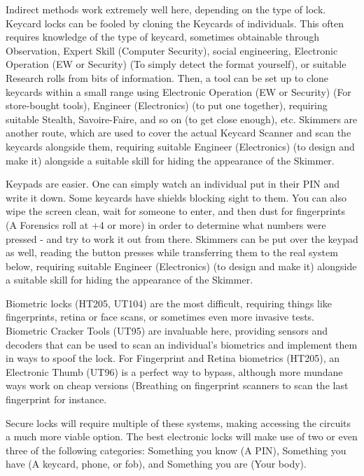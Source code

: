 \begin{multicols*}{2}
	Indirect methods work extremely well here, depending on the type of lock. Keycard locks can be fooled by cloning the Keycards of individuals. This often requires knowledge of the type of keycard, sometimes obtainable through Observation, Expert Skill (Computer Security), social engineering, Electronic Operation (EW or Security) (To simply detect the format yourself), or suitable Research rolls from bits of information. Then, a tool can be set up to clone keycards within a small range using Electronic Operation (EW or Security) (For store-bought tools), Engineer (Electronics) (to put one together), requiring suitable Stealth, Savoire-Faire, and so on (to get close enough), etc. Skimmers are another route, which are used to cover the actual Keycard Scanner and scan the keycards alongside them, requiring suitable Engineer (Electronics) (to design and make it) alongside a suitable skill for hiding the appearance of the Skimmer.
	
	Keypads are easier. One can simply watch an individual put in their PIN and write it down. Some keycards have shields blocking sight to them. You can also wipe the screen clean, wait for someone to enter, and then dust for fingerprints (A Forensics roll at +4 or more) in order to determine what numbers were pressed - and try to work it out from there. Skimmers can be put over the keypad as well, reading the button presses while transferring them to the real system below, requiring suitable Engineer (Electronics) (to design and make it) alongside a suitable skill for hiding the appearance of the Skimmer.
	
	Biometric locks (HT205, UT104) are the most difficult, requiring things like fingerprints, retina or face scans, or sometimes even more invasive tests. Biometric Cracker Tools (UT95) are invaluable here, providing sensors and decoders that can be used to scan an individual's biometrics and implement them in ways to spoof the lock. For Fingerprint and Retina biometrics (HT205), an Electronic Thumb (UT96) is a perfect way to bypass, although more mundane ways work on cheap versions (Breathing on fingerprint scanners to scan the last fingerprint for instance.
	
	Secure locks will require multiple of these systems, making accessing the circuits a much more viable option. The best electronic locks will make use of two or even three of the following categories: Something you know (A PIN), Something you have (A keycard, phone, or fob), and Something you are (Your body).
	

\end{multicols*}
